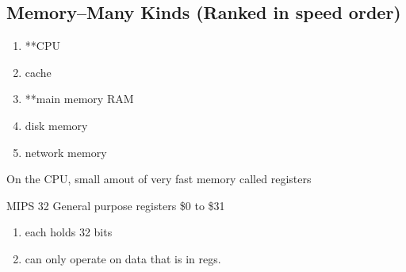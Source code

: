 \documentclass[11pt]{amsart}
\begin{document}
\subsection{Memory--Many Kinds (Ranked in speed order)}
\begin{enumerate}
  \item **CPU
  \item cache
  \item **main memory RAM
  \item disk memory
  \item network memory
\end{enumerate}
\par On the CPU, small amout of very fast memory called registers
\par MIPS 32 General purpose registers \$0 to \$31
\begin{enumerate}
  \item each holds 32 bits
  \item can only operate on data that is in regs.
\end{enumerate}
\end{document}
